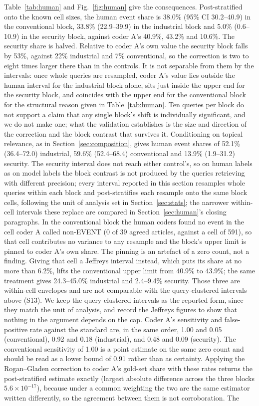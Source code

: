 \documentclass[1p,times]{elsarticle}
\begin{document}
Table~\ref{tab:human} and Fig.~\ref{fig:human} give the consequences. Post-stratified onto the known cell sizes, the human event share is 38.0\% (95\% CI 30.2--40.9) in the conventional block, 33.8\% (22.9--39.9) in the industrial block and 5.0\% (0.6--10.9) in the security block, against coder A's 40.9\%, 43.2\% and 10.6\%. The security share is halved. Relative to coder A's own value the security block falls by 53\%, against 22\% industrial and 7\% conventional, so the correction is two to eight times larger there than in the controls. It is not separable from them by the intervals: once whole queries are resampled, coder A's value lies outside the human interval for the industrial block alone, sits just inside the upper end for the security block, and coincides with the upper end for the conventional block for the structural reason given in Table~\ref{tab:human}. Ten queries per block do not support a claim that any single block's shift is individually significant, and we do not make one; what the validation establishes is the size and direction of the correction and the block contrast that survives it. Conditioning on topical relevance, as in Section~\ref{sec:composition}, gives human event shares of 52.1\% (36.4--72.0) industrial, 59.6\% (52.4--68.4) conventional and 13.9\% (1.9--31.2) security. The security interval does not reach either control's, so on human labels as on model labels the block contrast is not produced by the queries retrieving with different precision; every interval reported in this section resamples whole queries within each block and post-stratifies each resample onto the same block cells, following the unit of analysis set in Section~\ref{sec:stats}; the narrower within-cell intervals these replace are compared in Section~\ref{sec:human}'s closing paragraphs. In the conventional block the human coders found no event in the cell coder A called non-EVENT (0 of 39 agreed articles, against a cell of 591), so that cell contributes no variance to any resample and the block's upper limit is pinned to coder A's own share. The pinning is an artefact of a zero count, not a finding. Giving that cell a Jeffreys interval instead, which puts its share at no more than 6.2\%, lifts the conventional upper limit from 40.9\% to 43.9\%; the same treatment gives 24.3--45.0\% industrial and 2.4--9.4\% security. Those three are within-cell envelopes and are not comparable with the query-clustered intervals above (S13). We keep the query-clustered intervals as the reported form, since they match the unit of analysis, and record the Jeffreys figures to show that nothing in the argument depends on the cap. Coder A's sensitivity and false-positive rate against the standard are, in the same order, 1.00 and 0.05 (conventional), 0.92 and 0.18 (industrial), and 0.48 and 0.09 (security). The conventional sensitivity of 1.00 is a point estimate on the same zero count and should be read as a lower bound of 0.91 rather than as certainty. Applying the Rogan--Gladen correction to coder A's gold-set share with these rates returns the post-stratified estimate exactly (largest absolute difference across the three blocks $5.6 \times 10^{-17}$), because under a common weighting the two are the same estimator written differently, so the agreement between them is not corroboration. The 
\end{document}

